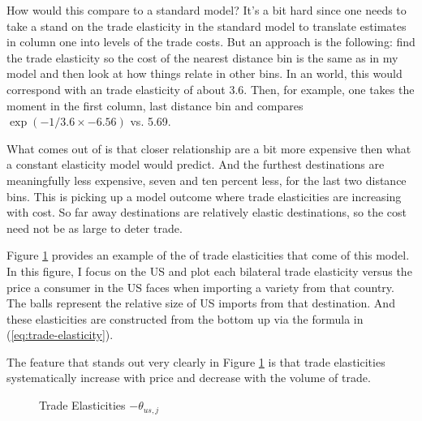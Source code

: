 \documentclass[12pt,pdftex]{article}
\begin{document}
\begin{onehalfspacing}
How would this compare to a standard model? It's a bit hard since one needs to take a stand on the trade elasticity in the standard model to translate estimates in column one into levels of the trade costs. But an approach is the following: find the trade elasticity so the cost of the nearest distance bin is the same as in my model and then look at how things relate in other bins. In an \citet{eaton2002technology} world, this would correspond with an trade elasticity of about 3.6. Then, for example, one takes the moment in the first column, last distance bin and compares $\exp( - 1 / 3.6 \times  -6.56)$ vs. 5.69.

What comes out of is that closer relationship are a bit more expensive then what a constant elasticity model would predict. And the furthest destinations are meaningfully less expensive, seven and ten percent less, for the last two distance bins. This is picking up a model outcome where trade elasticities are increasing with cost. So far away destinations are relatively elastic destinations, so the cost need not be as large to deter trade.

Figure \ref{fig:bilateral-elasticities} provides an example of the of trade elasticities that come of this model. In this figure, I focus on the US and plot each bilateral trade elasticity versus the price a consumer in the US faces when importing a variety from that country. The balls represent the relative size of US imports from that destination. And these elasticities are constructed from the bottom up via the formula in (\ref{eq:trade-elasticity}).

The feature that stands out very clearly in Figure \ref{fig:bilateral-elasticities} is that trade elasticities systematically increase with price and decrease with the volume of trade.

\begin{figure}[!t]
\caption{Trade Elasticities $-\theta_{us,j}$}\label{fig:bilateral-elasticities}
\end{figure}



\end{onehalfspacing}
\end{document}
